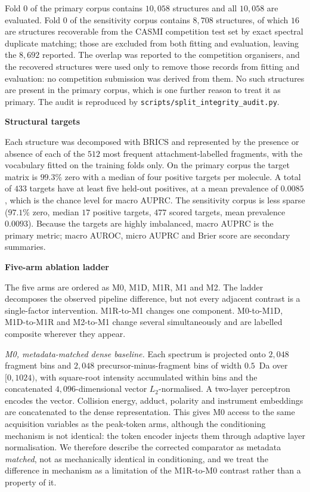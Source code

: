\documentclass[11pt]{article}
\newcommand{\hd}[1]{\medskip\par\noindent\textbf{#1}\par\nobreak\vspace{2pt}\noindent\ignorespaces}
\begin{document}
Fold 0 of the primary corpus contains $10{,}058$ structures and all $10{,}058$ are evaluated. Fold 0 of the sensitivity corpus contains $8{,}708$ structures, of which $16$ are structures recoverable from the CASMI competition test set by exact spectral duplicate matching; those are excluded from both fitting and evaluation, leaving the $8{,}692$ reported. The overlap was reported to the competition organisers, and the recovered structures were used only to remove those records from fitting and evaluation: no competition submission was derived from them. No such structures are present in the primary corpus, which is one further reason to treat it as primary. The audit is reproduced by \texttt{scripts/split\_integrity\_audit.py}.

\hd{Structural targets}
Each structure was decomposed with BRICS and represented by the presence or absence of each of the $512$ most frequent attachment-labelled fragments, with the vocabulary fitted on the training folds only. On the primary corpus the target matrix is $99.3\%$ zero with a median of four positive targets per molecule. A total of $433$ targets have at least five held-out positives, at a mean prevalence of $0.0085$, which is the chance level for macro AUPRC. The sensitivity corpus is less sparse ($97.1\%$ zero, median $17$ positive targets, $477$ scored targets, mean prevalence $0.0093$). Because the targets are highly imbalanced, macro AUPRC is the primary metric; macro AUROC, micro AUPRC and Brier score are secondary summaries.

\hd{Five-arm ablation ladder}
The five arms are ordered as M0, M1D, M1R, M1 and M2. The ladder decomposes the observed pipeline difference, but not every adjacent contrast is a single-factor intervention. M1R-to-M1 changes one component. M0-to-M1D, M1D-to-M1R and M2-to-M1 change several simultaneously and are labelled composite wherever they appear.

\emph{M0, metadata-matched dense baseline.} Each spectrum is projected onto $2{,}048$ fragment bins and $2{,}048$ precursor-minus-fragment bins of width $0.5$~Da over $[0,1024)$, with square-root intensity accumulated within bins and the concatenated $4{,}096$-dimensional vector $L_2$-normalised. A two-layer perceptron encodes the vector. Collision energy, adduct, polarity and instrument embeddings are concatenated to the dense representation. This gives M0 access to the same acquisition variables as the peak-token arms, although the conditioning mechanism is not identical: the token encoder injects them through adaptive layer normalisation. We therefore describe the corrected comparator as metadata \emph{matched}, not as mechanically identical in conditioning, and we treat the difference in mechanism as a limitation of the M1R-to-M0 contrast rather than a property of it.
\end{document}
